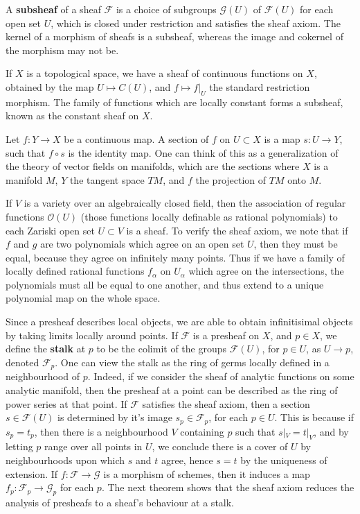 A {\bf subsheaf} of a sheaf $\mathcal{F}$ is a choice of subgroups $\mathcal{G}(U)$ of $\mathcal{F}(U)$ for each open set $U$, which is closed under restriction and satisfies the sheaf axiom. The kernel of a morphism of sheafs is a subsheaf, whereas the image and cokernel of the morphism may not be.

\begin{example}
    If $X$ is a topological space, we have a sheaf of continuous functions on $X$, obtained by the map $U \mapsto C(U)$, and $f \mapsto f|_U$ the standard restriction morphism. The family of functions which are locally constant forms a subsheaf, known as the constant sheaf on $X$.
\end{example}

\begin{example}
    Let $f: Y \to X$ be a continuous map. A section of $f$ on $U \subset X$ is a map $s: U \to Y$, such that $f \circ s$ is the identity map. One can think of this as a generalization of the theory of vector fields on manifolds, which are the sections where $X$ is a manifold $M$, $Y$ the tangent space $TM$, and $f$ the projection of $TM$ onto $M$.
\end{example}

\begin{example}
    If $V$ is a variety over an algebraically closed field, then the association of regular functions $\mathcal{O}(U)$ (those functions locally definable as rational polynomials) to each Zariski open set $U \subset V$ is a sheaf. To verify the sheaf axiom, we note that if $f$ and $g$ are two polynomials which agree on an open set $U$, then they must be equal, because they agree on infinitely many points. Thus if we have a family of locally defined rational functions $f_\alpha$ on $U_\alpha$ which agree on the intersections, the polynomials must all be equal to one another, and thus extend to a unique polynomial map on the whole space.
\end{example}

Since a presheaf describes local objects, we are able to obtain infinitisimal objects by taking limits locally around points. If $\mathcal{F}$ is a presheaf on $X$, and $p \in X$, we define the {\bf stalk} at $p$ to be the colimit of the groups $\mathcal{F}(U)$, for $p \in U$, as $U \to p$, denoted $\mathcal{F}_p$. One can view the stalk as the ring of germs locally defined in a neighbourhood of $p$. Indeed, if we consider the sheaf of analytic functions on some analytic manifold, then the presheaf at a point can be described as the ring of power series at that point. If $\mathcal{F}$ satisfies the sheaf axiom, then a section $s \in \mathcal{F}(U)$ is determined by it's image $s_p \in \mathcal{F}_p$, for each $p \in U$. This is because if $s_p = t_p$, then there is a neighbourhood $V$ containing $p$ such that $s|_V = t|_V$, and by letting $p$ range over all points in $U$, we conclude there is a cover of $U$ by neighbourhoods upon which $s$ and $t$ agree, hence $s = t$ by the uniqueness of extension. If $f: \mathcal{F} \to \mathcal{G}$ is a morphism of schemes, then it induces a map $f_p: \mathcal{F}_p \to \mathcal{G}_p$ for each $p$. The next theorem shows that the sheaf axiom reduces the analysis of presheafs to a sheaf's behaviour at a stalk.

